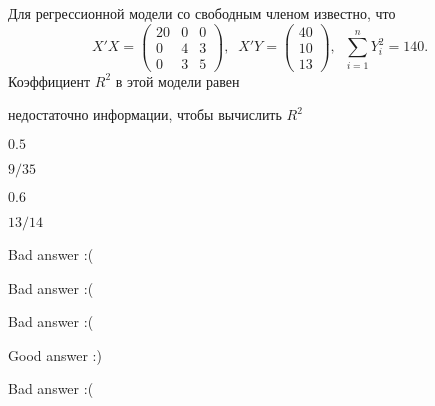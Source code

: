 
\begin{question}
Для регрессионной модели со свободным членом известно, что
\[
X'X = \begin{pmatrix}
20 & 0 & 0 \\
0 & 4 & 3 \\
0 & 3 & 5 
\end{pmatrix}, \; \;
X'Y = \begin{pmatrix}
40 \\
10 \\
13
\end{pmatrix}, \;\;
\sum_{i=1}^n Y_i^2 = 140.
\]
Коэффициент \(R^2\) в этой модели равен
\begin{answerlist}
  \item недостаточно информации, чтобы вычислить \(R^2\)
  \item \(0.5\)
  \item \(9/35\)
  \item \(0.6\)
  \item \(13/14\)
\end{answerlist}
\end{question}

\begin{solution}
\begin{answerlist}
  \item Bad answer :(
  \item Bad answer :(
  \item Bad answer :(
  \item Good answer :)
  \item Bad answer :(
\end{answerlist}
\end{solution}

